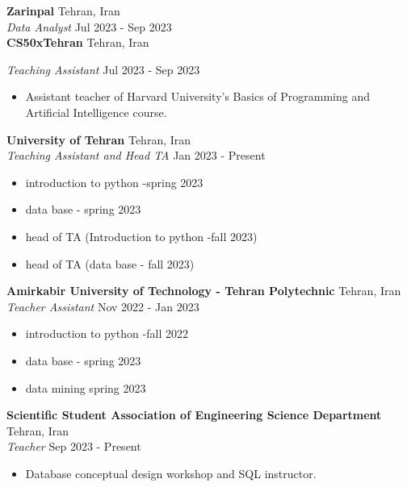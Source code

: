 \documentclass[a4paper,9pt]{extarticle}
\begin{document}
\noindent
\textbf{Zarinpal} \hfill Tehran, Iran\\ %
\textit{Data Analyst} \hfill Jul 2023 - Sep 2023\\   %


\noindent
\textbf{CS50xTehran} \hfill Tehran, Iran

\textit{Teaching Assistant} \hfill Jul 2023 - Sep 2023  %
\begin{itemize}
    \item Assistant teacher of Harvard University's Basics of Programming and Artificial Intelligence course. %
\end{itemize}

\noindent
\textbf{University of Tehran} \hfill Tehran, Iran\\ %
\textit{Teaching Assistant and Head TA} \hfill Jan 2023 - Present %
\begin{itemize}
    \item introduction to python -spring 2023
    \item  data base - spring 2023
    \item  head of TA (Introduction to python -fall 2023)
    \item  head of TA (data base - fall 2023)  
\end{itemize}

\noindent
\textbf{Amirkabir University of Technology - Tehran Polytechnic} \hfill Tehran, Iran\\ %
\textit{Teacher Assistant} \hfill Nov 2022 - Jan 2023%
\begin{itemize}
    \item introduction to python -fall 2022
    \item  data base - spring 2023
    \item  data  mining spring 2023
\end{itemize}


\noindent
\textbf{Scientific Student Association of Engineering Science Department} \hfill Tehran, Iran\\ %
\textit{Teacher} \hfill Sep 2023 - Present %
\begin{itemize}
    \item Database conceptual design workshop  and SQL instructor. %
\end{itemize}
\end{document}
